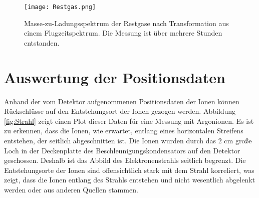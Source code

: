 \begin{figure}
    \hspace{-1.1cm}\texttt{[image: Restgas.png]}
    \caption[Masse-zu-Ladungsspektrum der Restgase]{Masse-zu-Ladungsspektrum der Restgase nach Transformation aus einem Flugzeitspektrum. Die Messung ist über mehrere Stunden entstanden.}
    \label{fig:rest}
\end{figure}

\section{Auswertung der Positionsdaten}
Anhand der vom Detektor aufgenommenen Positionsdaten der Ionen können Rückschlüsse auf den Entstehungsort der Ionen gezogen werden. Abbildung \ref{fig:Strahl} zeigt einen Plot dieser Daten für eine Messung mit Argonionen. Es ist zu erkennen, dass die Ionen, wie erwartet, entlang eines horizontalen Streifens entstehen, der seitlich abgeschnitten ist. Die Ionen wurden durch das 2 cm große Loch in der Deckenplatte des Beschleunigungskondensators auf den Detektor geschossen. Deshalb ist das Abbild des Elektronenstrahls seitlich begrenzt. Die Entstehungsorte der Ionen sind offensichtlich stark mit dem Strahl korreliert, was zeigt, dass die Ionen entlang des Strahls entstehen und nicht wesentlich abgelenkt werden oder aus anderen Quellen stammen.

